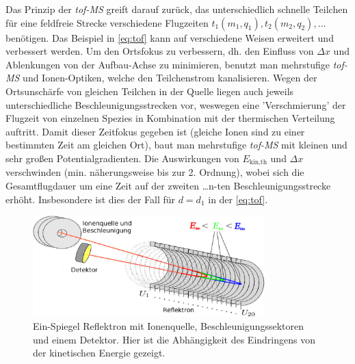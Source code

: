 \documentclass[numbers=noenddot,a4paper,notitlepage,twoside,BCOR15mm]{scrartcl}
\newcommand{\ix}[1]{_\text{#1}}
\newcommand{\tilt}[1]{\textit{#1}}
\begin{document}
		Das Prinzip der \tilt{tof-MS} greift darauf zurück, das unterschiedlich schnelle Teilchen für eine feldfreie Strecke verschiedene Flugzeiten $t\ix{1}(m\ix{1},q\ix{1}),t\ix{2}(m\ix{2},q\ix{2}),\dots$ benötigen. Das Beispiel in \autoref{eq:tof} kann auf verschiedene Weisen erweitert und verbessert werden. Um den Ortsfokus zu verbessern, dh. den Einfluss von $\Delta x$ und Ablenkungen von der Aufbau-Achse zu minimieren, benutzt man mehrstufige \tilt{tof-MS} und Ionen-Optiken, welche den Teilchenstrom kanalisieren. Wegen der Ortsunschärfe von gleichen Teilchen in der Quelle liegen auch jeweils unterschiedliche Beschleunigungsstrecken vor, weswegen eine 'Verschmierung' der Flugzeit von einzelnen Spezies in Kombination mit der thermischen Verteilung auftritt. Damit dieser Zeitfokus gegeben ist (gleiche Ionen sind zu einer bestimmten Zeit am gleichen Ort), baut man mehrstufige \tilt{tof-MS} mit kleinen und sehr großen Potentialgradienten. Die Auswirkungen von $E\ix{kin,th}$ und $\Delta x$ verschwinden (min. näherungsweise bis zur 2. Ordnung), wobei sich die Gesamtflugdauer um eine Zeit auf der zweiten \dots n-ten Beschleunigungsstrecke erhöht. Insbesondere ist dies der Fall für $d=d\ix{1}$  in der \autoref{eq:tof}.

			\begin{figure}[t]
				\centering
				\includegraphics[width=0.8\textwidth]{einspiegel.png}
				\caption{Ein-Spiegel Reflektron mit Ionenquelle, Beschleunigungssektoren und einem Detektor. Hier ist die Abhängigkeit des Eindringens von der kinetischen Energie gezeigt. \cite{EMAUGreifswaldReflektron}}
				\label{img:reflektron1}
			\end{figure}
\end{document}
